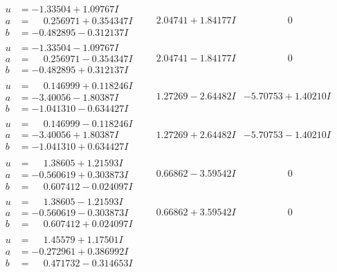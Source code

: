 \documentclass[1p]{elsarticle_modified}
\theoremstyle{definition}
\begin{document}
$$\begin{array}{c|c|c}
\begin{aligned}
u &= -1.33504 + 1.09767 I \\
a &= \phantom{-}0.256971 + 0.354347 I \\
b &= -0.482895 - 0.312137 I\end{aligned}
 & \phantom{-}2.04741 + 1.84177 I & \phantom{-0.000000 } 0 \\ \hline\begin{aligned}
u &= -1.33504 - 1.09767 I \\
a &= \phantom{-}0.256971 - 0.354347 I \\
b &= -0.482895 + 0.312137 I\end{aligned}
 & \phantom{-}2.04741 - 1.84177 I & \phantom{-0.000000 } 0 \\ \hline\begin{aligned}
u &= \phantom{-}0.146999 + 0.118246 I \\
a &= -3.40056 - 1.80387 I \\
b &= -1.041310 - 0.634427 I\end{aligned}
 & \phantom{-}1.27269 - 2.64482 I & -5.70753 + 1.40210 I \\ \hline\begin{aligned}
u &= \phantom{-}0.146999 - 0.118246 I \\
a &= -3.40056 + 1.80387 I \\
b &= -1.041310 + 0.634427 I\end{aligned}
 & \phantom{-}1.27269 + 2.64482 I & -5.70753 - 1.40210 I \\ \hline\begin{aligned}
u &= \phantom{-}1.38605 + 1.21593 I \\
a &= -0.560619 + 0.303873 I \\
b &= \phantom{-}0.607412 - 0.024097 I\end{aligned}
 & \phantom{-}0.66862 - 3.59542 I & \phantom{-0.000000 } 0 \\ \hline\begin{aligned}
u &= \phantom{-}1.38605 - 1.21593 I \\
a &= -0.560619 - 0.303873 I \\
b &= \phantom{-}0.607412 + 0.024097 I\end{aligned}
 & \phantom{-}0.66862 + 3.59542 I & \phantom{-0.000000 } 0 \\ \hline\begin{aligned}
u &= \phantom{-}1.45579 + 1.17501 I \\
a &= -0.272961 + 0.386992 I \\
b &= \phantom{-}0.471732 - 0.314653 I\end{aligned}

\end{array}$$
\end{document}
